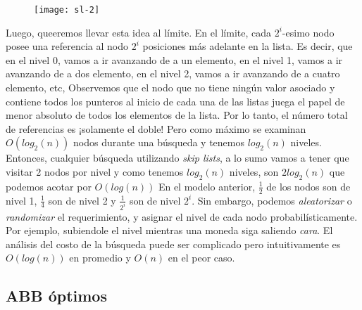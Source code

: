 \documentclass[10pt,a4paper]{article}
\begin{document}
\newline
\newline
\begin{figure}[h]
	\centering
\texttt{[image: sl-2]}
	\label{drivers1}
\end{figure}      
\newline
\newline
Luego, queeremos llevar esta idea al límite. En el límite, cada $2^{i}$-esimo nodo posee una referencia al nodo $2^{i}$ posiciones más adelante en la lista. Es decir, que en el nivel 0, vamos a ir avanzando de a un elemento, en el nivel 1, vamos a ir avanzando de a dos elemento, en el nivel 2, vamos a ir avanzando de a cuatro elemento, etc,  
\newline
\newline
Observemos que el nodo que no tiene ningún valor asociado y contiene todos los punteros al inicio de cada una de las listas juega el papel de menor absoluto de  todos los elementos de la lista.
\newline
\newline
Por lo tanto, el número total de referencias es ¡solamente el doble!
\newline
\newline
Pero como máximo se examinan $O(log_{2}(n))$ nodos durante una búsqueda y tenemos $log_{2}(n)$ niveles.
\newline
\newline
Entonces, cualquier búsqueda utilizando \textit{skip lists}, a lo sumo vamos a tener que visitar 2 nodos por nivel y como tenemos $log_{2}(n)$ niveles, son $2log_{2}(n)$ que podemos acotar por $O(log(n))$    
\newline
\newline
En el modelo anterior, $\displaystyle \frac{1}{2}$ de los nodos son de nivel 1, $\displaystyle \frac{1}{4}$ son de nivel 2 y $\displaystyle \frac{1}{2^{i}}$ son de nivel $2^{i}$. 
\newline
\newline
Sin embargo, podemos \textit{aleatorizar} o \textit{randomizar} el requerimiento, y asignar el nivel de cada nodo probabilísticamente. Por ejemplo, subiendole el nivel mientras una moneda siga saliendo \textit{cara}.
\newline
\newline
El análisis del costo de la búsqueda puede ser complicado pero intuitivamente es $O(log(n))$ en promedio y $O(n)$ en el peor caso. 
\newpage

\subsection{ABB óptimos}
\end{document}
